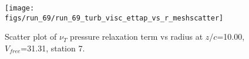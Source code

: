 \begin{figure}[H]
\centering
\texttt{[image: figs/run\_69/run\_69\_turb\_visc\_ettap\_vs\_r\_meshscatter]}
\caption{Scatter plot of $\nu_T$ pressure relaxation term vs radius at $z/c$=10.00, $V_{free}$=31.31, station 7.}
\label{fig:run_69_turb_visc_ettap_vs_r_meshscatter}
\end{figure}



